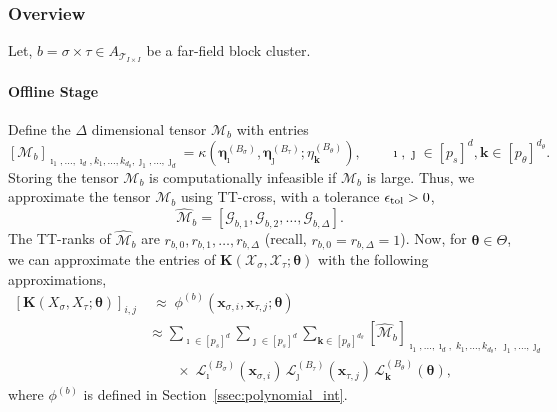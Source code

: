 \documentclass[final,3p,times]{elsarticle}
\newcommand{\mc}[1]{\mathcal{#1}}
\renewcommand{\vec}[1]{\boldsymbol{#1}}
\newcommand{\mat}[1]{\boldsymbol{#1}}
\newcommand{\ten}[1]{\boldsymbol{\mathcal{#1}}}
\newcommand{\tenh}[1]{\widehat{\boldsymbol{\mc{#1}}}}
\begin{document}
\subsubsection{Overview}

Let, $b = \sigma \times \tau \in A_{\mc{T}_{I \times I}}$ be a far-field block cluster. 
\paragraph{Offline Stage}
Define the $\Delta$ dimensional tensor $\ten{M}_{b}$ with entries
$$[\ten{M}_{b}]_{\imath_1,  \dots, \imath_d, k_1, \dots, k_{d_\theta}, \jmath_1,  \dots, \jmath_d} = \kappa(\vec{\eta}^{(B_{\sigma})}_{\vec{\imath}}, \vec{\eta}^{(B_{\tau})}_{\vec{\jmath}}; \eta^{(B_{\theta})}_{\vec{k}}), \qquad \vec{\imath},\vec{\jmath} \in [p_s]^d, \vec{k} \in [p_\theta]^{d_\theta}.$$
Storing the tensor $\ten{M}_{b}$ is computationally infeasible if $\ten{M}_{b}$ is large. Thus, we approximate the tensor $\ten{M}_{b}$ using TT-cross, with a tolerance $\epsilon_{\rm{tol}} > 0$,
$$\tenh{M}_{b} = [\ten{G}_{b,1}, \ten{G}_{b,2}, \dots, \ten{G}_{b,\Delta}].$$
The  TT-ranks of $\tenh{M}_{b}$ are $r_{b, 0},r_{b, 1}, \dots, r_{b,\Delta}$ (recall, $r_{b,0} = r_{b, \Delta} = 1$). Now, for $\vec{\theta} \in \Theta$, we can approximate the entries of $\mat{K}(\mc{X}_{\sigma}, \mc{X}_{\tau}; \vec{\theta})$ with the following approximations,
\begin{equation}\label{eqn:ff_bc_eqn1}
\begin{aligned}
\left[\mat{K}({X}_{\sigma}, {X}_{\tau}; \vec{\theta})\right]_{i, j} 
&\;\approx\; 
\phi^{(b)}(\vec{x}_{\sigma, i}, \vec{x}_{\tau, j}; \vec{\theta}) \\[0.5em]
&\approx
\sum_{\vec{\imath} \in [p_{s}]^d} 
\sum_{\vec{\jmath} \in [p_s]^d}
\sum_{\vec{k} \in [p_\theta]^{d_\theta}}
[\tenh{M}_{b}]_{\imath_1, \dots, \imath_d,\; 
                 k_1, \dots, k_{d_\theta},\;
                 \jmath_1, \dots, \jmath_d} \\
&\hspace{2em}\times\;
\mc{L}_{\vec{\imath}}^{(B_{\sigma})}(\vec{x}_{\sigma, i})\,
\mc{L}_{\vec{\jmath}}^{(B_{\tau})}(\vec{x}_{\tau, j})\,
\mc{L}_{\vec{k}}^{(B_{\theta})}(\vec{\theta}),
\end{aligned}
\end{equation}
where $\phi^{(b)}$ is defined in Section~\ref{ssec:polynomial_int}.
\end{document}
